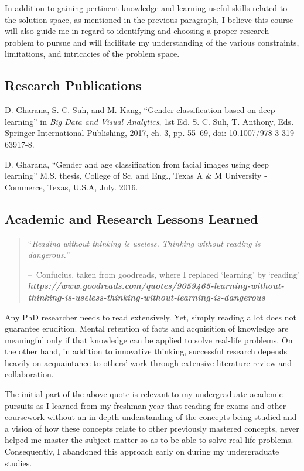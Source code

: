 \documentclass[journal]{IEEEtran}
\begin{document}
\noindent In addition to gaining pertinent knowledge and learning useful skills related to the solution space, as mentioned in the previous paragraph, I believe this course will also guide me in regard to identifying and choosing a proper research problem to pursue and will facilitate my understanding of the various constraints, limitations, and intricacies of the problem space.        

\subsection{Research Publications}
\label{sec:publications}  

D. Gharana, S. C. Suh, and M. Kang, ``Gender classification based on deep learning'' in \textit{Big Data and Visual Analytics}, 1st Ed. S. C. Suh, T. Anthony, Eds. Springer International Publishing, 2017, ch. 3, pp. 55–69, doi: 10.1007/978-3-319-63917-8.  

D. Gharana, ``Gender and age classification from facial images using deep learning'' M.S. thesis, College of Sc. and Eng., Texas A \& M University - Commerce, Texas, U.S.A, July. 2016.  

\subsection{Academic and Research Lessons Learned}   
\label{sec:lessonslearned}

\begin{quote}
	``\textit{Reading without thinking is useless. Thinking without reading is dangerous.}''
	
	\raggedleft
	--\ \footnotesize Confucius, taken from goodreads, where I replaced `learning' by `reading' \\ \tiny \textbf{\textit{https://www.goodreads.com/quotes/9059465-learning-without-thinking-is-useless-thinking-without-learning-is-dangerous}}
\end{quote}

\noindent Any PhD researcher needs to read extensively. Yet, simply reading a lot does not guarantee
erudition. Mental retention of facts and acquisition of knowledge are meaningful only if that
knowledge can be applied to solve real-life problems. On the other hand, in addition to innovative thinking, successful research depends heavily on acquaintance to others' work through extensive literature review and collaboration.  

\noindent The initial part of the above quote is relevant to my undergraduate academic pursuits as I learned from my freshman year that reading for exams and other coursework without an in-depth understanding of the concepts being studied and a vision of how these concepts relate to other previously mastered concepts, never helped me master the subject matter so as to be able to solve real life problems. Consequently, I abandoned this approach early on during my undergraduate studies.  
\end{document}
